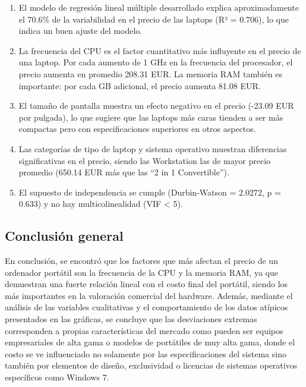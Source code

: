 \documentclass[12pt,a4paper]{article}
\begin{document}
\begin{enumerate}[leftmargin=1.5cm]
    \item El modelo de regresión lineal múltiple desarrollado explica aproximadamente el 70.6\% de la variabilidad en el precio de las laptops (R² = 0.706), lo que indica un buen ajuste del modelo.
    
    \item La frecuencia del CPU es el factor cuantitativo más influyente en el precio de una laptop. Por cada aumento de 1 GHz en la frecuencia del procesador, el precio aumenta en promedio 208.31 EUR. La memoria RAM también es importante: por cada GB adicional, el precio aumenta 81.08 EUR.
    
    \item El tamaño de pantalla muestra un efecto negativo en el precio (-23.09 EUR por pulgada), lo que sugiere que las laptops más caras tienden a ser más compactas pero con especificaciones superiores en otros aspectos.
    
    \item Las categorías de tipo de laptop y sistema operativo muestran diferencias significativas en el precio, siendo las Workstation las de mayor precio promedio (650.14 EUR más que las ``2 in 1 Convertible'').
    
    \item El supuesto de independencia se cumple (Durbin-Watson = 2.0272, p = 0.633) y no hay multicolinealidad (VIF \textless{} 5).
    
\end{enumerate}

\subsection{Conclusión general}

En conclusión, se encontró que los factores que más afectan el precio de un ordenador portátil son la frecuencia de la CPU y la memoria RAM, ya que demuestran una fuerte relación lineal con el costo final del portátil, siendo los más importantes en la valoración comercial del hardware. Además, mediante el análisis de las variables cualitativas y el comportamiento de los datos atípicos presentados en las gráficas, se concluye que las desviaciones extremas corresponden a propias características del mercado como pueden ser equipos empresariales de alta gama o modelos de portátiles de muy alta gama, donde el costo se ve influenciado no solamente por las especificaciones del sistema sino también por elementos de diseño, exclusividad o licencias de sistemas operativos específicos como Windows 7. 
\end{document}
